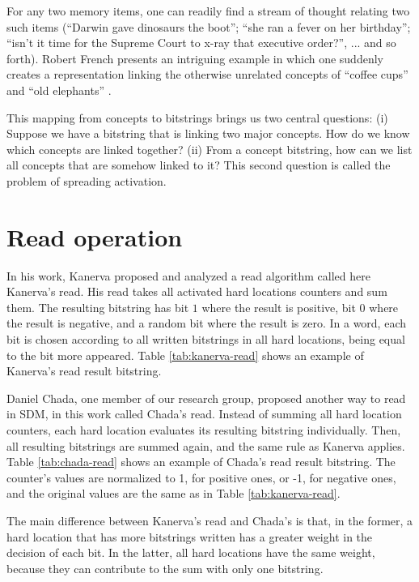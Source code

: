 For any two memory items, one can readily find a stream of thought relating two such items (``Darwin gave dinosaurs the boot''; ``she ran a fever on her birthday''; ``isn't it time for the Supreme Court to x-ray that executive order?'', ... and so forth). Robert French presents an intriguing example in which one suddenly creates a representation linking the otherwise unrelated concepts of ``coffee cups'' and ``old elephants'' \citep{French1997}.

This mapping from concepts to bitstrings brings us two central questions: (i) Suppose we have a bitstring that is linking two major concepts.  How do we know which concepts are linked together? (ii) From a concept bitstring, how can we list all concepts that are somehow linked to it? This second question is called the problem of spreading activation.


\section{Read operation}

In his work, Kanerva proposed and analyzed a read algorithm called here Kanerva's read. His read takes all activated hard locations counters and sum them. The resulting bitstring has bit $1$ where the result is positive, bit $0$ where the result is negative, and a random bit where the result is zero. In a word, each bit is chosen according to all written bitstrings in all hard locations, being equal to the bit more appeared. Table \ref{tab:kanerva-read} shows an example of Kanerva's read result bitstring.

Daniel Chada, one member of our research group, proposed another way to read in SDM, in this work called Chada's read. Instead of summing all hard location counters, each hard location evaluates its resulting bitstring individually. Then, all resulting bitstrings are summed again, and the same rule as Kanerva applies. Table \ref{tab:chada-read} shows an example of Chada's read result bitstring. The counter's values are normalized to 1, for positive ones, or -1, for negative ones, and the original values are the same as in Table \ref{tab:kanerva-read}.

The main difference between Kanerva's read and Chada's is that, in the former, a hard location that has more bitstrings written has a greater weight in the decision of each bit. In the latter, all hard locations have the same weight, because they can contribute to the sum with only one bitstring.

